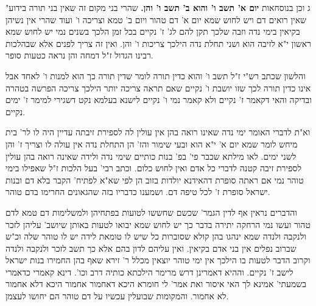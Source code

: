 \documentclass[12pt, openany]{book}
\begin{document}
{"ג וכן בנוסחאות \textbf{יום א' תשב ו' והוא ב' תשב ו' והן.}  שהרי בני מקום זה שאין בני תורה בידוע שאין רואים דם ויש לחוש שמא יום א' דם טהור ויום ב' טמא וצריכה ו' ועוד שהרי אין נשיהן בקיאין בימי נדה וזבה שלכך תקן להם לג' ז' נקיים בכל זמן הלכך בשנים נמי יש לחוש שמא ראשון י"א לזיבה הוא ושני תחלת נדה הילכך צריכות ו' והן. ואין זה צריך לפנים אלא שבהלכות רבינו הגדול ז"ל דמחה והן נראה כטעות סופר.\par  והלשון שכתב רש"י ז"ל תשב ו' והוא כדין תורה לומר שדין תורה כך הוא למנות ו' לאחד אבל אינו כדין תורה לכך שזו יושבת ו' נקיים שאם תראה צריכה יותר הילכך צריכה הפרשה בטהרה ובדיקה והאי דקאמר ז' נקיים ולא קאמר נמי ו' נקיים לישנא בעלמא נקט דשגירי למימר ז' ימים נקיים.\par  וא"ת לדברי האומר ימי נדה שאינו רואה בהן אין עולין לה לספירת זיבתה עדיין היה לו לר' בית מיחש לומר שמא יום א' י"א הוא ובעי שימור והז' הן התחלת נדה אין עולה לו וצריך ז' והן לשני ימים. לאו מילתא שכבר פי' בפ' בנות כותיים שימי נדה ולידה שאינה רואה בהן עולין לספירת זיבה קטנה לדברי כל אדם ואין לחוש כלום. וכתב רבי' בעל הלכות ז"ל שאפילו בימי טוהר נמי אם ראתה סופרת דהאידנא יולדות בזוב הן לפי שא"א לפתיח' הקבר בלא דם ובנות ישראל סופרת ז' לכל טיפה דם. ושמענו כדבריו בזה שהגאונים החרימו בדם טוהר.\par  והדברים נראין אף לדין הגמר' שכשם שחששו לטועות בפתחיהן ולמשלימות דם טמא לדם טהור ועשו נמי הרחקה יתירה בדבר כך יש לחוש שמא יבואו לטעות באותן שיושב' עליהן לזכר ולנקבה ולנדה שמא ינהגו בהן קולא שסוברות כל שיש לו טומאת לידה יש לו טוהר שלה וכ"ש שברוב נפלים אין בני אדם בקיאין. ואין עליהם לדון בהם אלא כך תשב לזכר ולנקבה ולנדה וקרוב הדבר לטעות בו הילכך אין ימי טוהר יוצאין מכלל ר' זירא שאף בהן החמירו בנות ישראל לישב ז' נקיים. וההיא דאמרינן דרש מרימר הילכתא כותיה דרב וכו'. דינא קאמרי כדאמרי בשמעתי' אמינא לך האי איסור ואת אמר' לי חומרא היכא דאחמור אחמור היכא דלא אחמור לא אחמור. והמקומות שבועלין עכשיו על דם טוהר הם יחושו לעצמן. 
\par}
\end{document}
